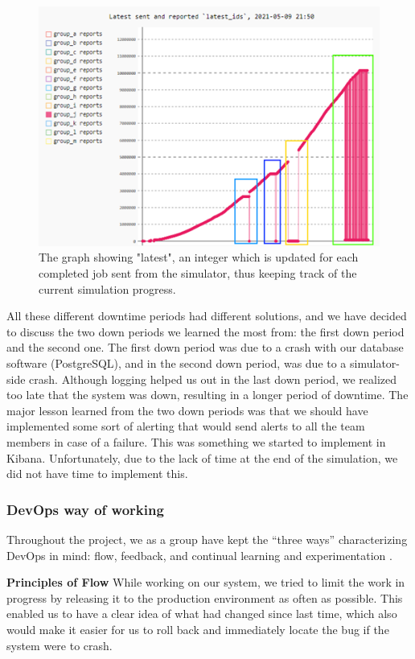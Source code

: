 \begin{figure}[h!]
    \centering
    \includegraphics[scale=0.7]{images/downperiodes.png}
    \caption{The graph showing "latest", an integer which is updated for each completed job sent from the simulator, 
    thus keeping track of the current simulation progress. }
\end{figure}
 
All these different downtime periods had different solutions, and we have decided to discuss the two down periods we 
learned the most from: the first down period and the second one. 
The first down period was due to a crash with our database software (PostgreSQL), and in the second down period, 
was due to a simulator-side crash. Although logging helped us out in the last down period, 
we realized too late that the system was down, resulting in a longer period of downtime. 
The major lesson learned from the two down periods was that we should have implemented some sort of alerting 
that would send alerts to all the team members in case of a failure. This was something we started to 
implement in Kibana. Unfortunately, due to the lack of time at the end of the simulation, we did not have time to implement this.

\subsubsection{DevOps way of working}
Throughout the project, we as a group have kept the “three ways” characterizing DevOps in mind: 
flow, feedback, and continual learning and experimentation \cite{devopshandbook}.

\textbf{ Principles of Flow}
While working on our system, we tried to limit the work in progress by releasing it to the production environment as often as possible. This enabled us to have a clear idea of what had changed since last time, which also would make it easier for us to roll back and immediately locate the bug if the system were to crash.

